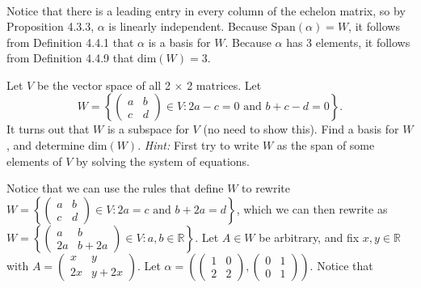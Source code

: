 \documentclass[12pt]{article}
\newenvironment{problem}[2][Problem]
{
	\begin{trivlist} 
		\item[\hskip \labelsep {\bfseries #1 #2:}]
	}
{
	\end{trivlist}
	}
\newenvironment{solution}[1][Solution]
{
	\begin{trivlist} 
		\item[\hskip \labelsep {\itshape #1:}]
	}
	{
	\end{trivlist}
}
\begin{document}
\begin{problem}{1}
\begin{solution}
\begin{align*}
\end{align*}
Notice that there is a leading entry in every column of the echelon matrix, so by Proposition 4.3.3, $\alpha$ is linearly independent. Because $\text{Span}(\alpha) = W$, it follows from Definition 4.4.1 that $\alpha$ is a basis for $W$. Because $\alpha$ has 3 elements, it follows from Definition 4.4.9 that dim$(W)=3$.
\end{solution}
\end{problem}






\newpage
\begin{problem}{2}
Let $V$ be the vector space of all 2 $\times$ 2 matrices. Let
\[
W = \left\{ \begin{pmatrix} a&b\\c&d \end{pmatrix} \in V : 2a-c=0 \text{ and } b+c-d=0 \right\} \text{.}
\]
It turns out that $W$ is a subspace for $V$ (no need to show this). Find a basis for $W$, and determine dim$(W)$.
\newline
\noindent
{\it Hint:} First try to write $W$ as the span of some elements of $V$ by solving the system of equations.
\noindent
\newline
\newline
\begin{solution}
Notice that we can use the rules that define $W$ to rewrite
\newline
\noindent
$W = \left\{ \begin{pmatrix} a&b\\c&d \end{pmatrix} \in V : 2a=c \text{ and } b+2a=d \right\}$, which we can then rewrite as
\newline
\noindent
$W=\left\{ \begin{pmatrix} a&b\\2a&b+2a \end{pmatrix} \in V : a,b \in \mathbb{R} \right\}$. Let $A \in W$ be arbitrary, and fix $x,y \in \mathbb{R}$ with $A = \begin{pmatrix} x&y\\2x&y+2x\end{pmatrix}$. Let $\alpha = \left( \begin{pmatrix} 1&0\\2&2 \end{pmatrix}, \begin{pmatrix} 0&1\\0&1 \end{pmatrix} \right)$. Notice that

\end{solution}
\end{problem}
\end{document}
